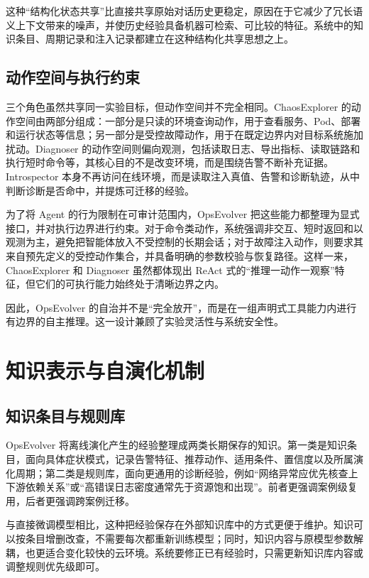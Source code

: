 这种“结构化状态共享”比直接共享原始对话历史更稳定，原因在于它减少了冗长语义上下文带来的噪声，并使历史经验具备机器可检索、可比较的特征。系统中的知识条目、周期记录和注入记录都建立在这种结构化共享思想之上。

\subsection{动作空间与执行约束}

三个角色虽然共享同一实验目标，但动作空间并不完全相同。ChaosExplorer 的动作空间由两部分组成：一部分是只读的环境查询动作，用于查看服务、Pod、部署和运行状态等信息；另一部分是受控故障动作，用于在既定边界内对目标系统施加扰动。Diagnoser 的动作空间则偏向观测，包括读取日志、导出指标、读取链路和执行短时命令等，其核心目的不是改变环境，而是围绕告警不断补充证据。Introspector 本身不再访问在线环境，而是读取注入真值、告警和诊断轨迹，从中判断诊断是否命中，并提炼可迁移的经验。

为了将 Agent 的行为限制在可审计范围内，OpsEvolver 把这些能力都整理为显式接口，并对执行边界进行约束。对于命令类动作，系统强调非交互、短时返回和以观测为主，避免把智能体放入不受控制的长期会话；对于故障注入动作，则要求其来自预先定义的受控动作集合，并具备明确的参数校验与恢复路径。这样一来，ChaosExplorer 和 Diagnoser 虽然都体现出 ReAct 式的“推理一动作一观察”特征，但它们的可执行能力始终处于清晰边界之内。

因此，OpsEvolver 的自治并不是“完全放开”，而是在一组声明式工具能力内进行有边界的自主推理。这一设计兼顾了实验灵活性与系统安全性。

\section{知识表示与自演化机制}
\label{sec:self_evolve_mechanism}

\subsection{知识条目与规则库}

OpsEvolver 将离线演化产生的经验整理成两类长期保存的知识。第一类是知识条目，面向具体症状模式，记录告警特征、推荐动作、适用条件、置信度以及所属演化周期；第二类是规则库，面向更通用的诊断经验，例如“网络异常应优先核查上下游依赖关系”或“高错误日志密度通常先于资源饱和出现”。前者更强调案例级复用，后者更强调跨案例迁移。

与直接微调模型相比，这种把经验保存在外部知识库中的方式更便于维护。知识可以按条目增删改查，不需要每次都重新训练模型；同时，知识内容与原模型参数解耦，也更适合变化较快的云环境。系统要修正已有经验时，只需更新知识库内容或调整规则优先级即可。

